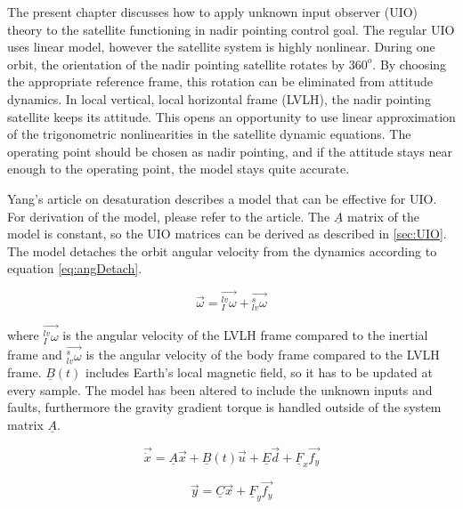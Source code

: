 The present chapter discusses how to apply unknown input observer (UIO) theory to the satellite functioning in nadir pointing control goal. The regular UIO uses linear model, however the satellite system is highly nonlinear.  During one orbit, the orientation of the nadir pointing satellite rotates by $360^o$. By choosing the appropriate reference frame, this rotation can be eliminated from attitude dynamics. In local vertical, local horizontal frame (LVLH), the nadir pointing satellite keeps its attitude. This opens an opportunity to use linear approximation of the trigonometric nonlinearities in the satellite dynamic equations. The operating point should be chosen as nadir pointing, and if the attitude stays near enough to the operating point, the model stays quite accurate.


Yang's article on desaturation \cite{DesatYang} describes a model that can be effective for UIO. For derivation of the model, please refer to the article. The $\underline{A}$ matrix of the model is constant, so the UIO matrices can be derived as described in \ref{sec:UIO}. The model detaches the orbit angular velocity from the dynamics according to equation \ref{eq:angDetach}.

\begin{equation}
\label{eq:angDetach}
\vec{\omega} = \vec{_I^{lv}\omega} + \vec{_{lv}^s\omega}
\end{equation}

where $\vec{_I^{lv}\omega}$ is the angular velocity of the LVLH frame compared to the inertial frame and $\vec{_{lv}^s\omega}$ is the angular velocity of the body frame compared to the LVLH frame. $\underline{B}(t)$ includes Earth's local magnetic field, so it has to be updated at every sample. The model has been altered to include the unknown inputs and faults, furthermore the gravity gradient torque is handled outside of the system matrix $\underline{A}$.

\begin{equation}
\vec{\dot{x}} =
\underline{A}\vec{x} + \underline{B}(t)\vec{u} + \underline{E} \vec{d} + \underline{F}_x \vec{f_y} 
\label{eq:uioagain}
\end{equation}

\begin{equation}
\vec{y} =
\underline{C}\vec{x} + \underline{F}_y \vec{f_y} 
\label{eq:uioagain2}
\end{equation}

